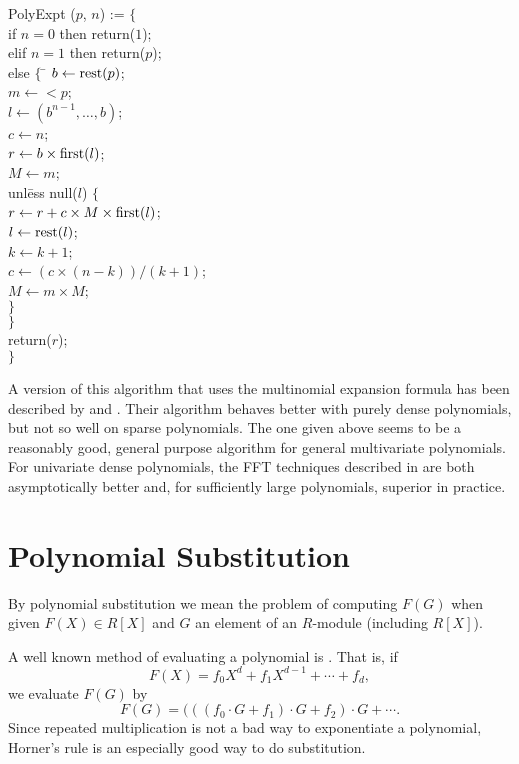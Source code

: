 \begindsacode
PolyExpt ($p$, $n$) := $\{$ \\
\> if $n=0$ then return($1$); \\
\> elif $n=1$ then return($p$); \\
\> else $\{$ \= $b \leftarrow \mbox{\rm rest}(p)$; \\
\> \> $m \leftarrow \lt p$; \\
\> \> $l \leftarrow (b^{n-1}, \ldots, b)$; \\
\> \> $c \leftarrow n$; \\
\> \> $r \leftarrow b \times \mbox{\rm first}(l)$; \\
\> \> $M \leftarrow m$; \\
\> \> unl\=ess null($l$) $\{$ \\
\> \> \> $r \leftarrow r + c \times M \times \mbox{\rm first}(l)$; \\
\> \> \> $l \leftarrow \mbox{\rm rest}(l)$; \\
\> \> \> $k \leftarrow k+1$; \\
\> \> \> $c \leftarrow (c \times (n - k))/(k+1)$; \\
\> \> \> $M \leftarrow m \times M$; \\
\> \> \> $\}$ \\
\> \> $\}$ \\
\> \> return($r$); \\
\> $\}$
\enddsacode

A version of this algorithm that uses the multinomial expansion
formula has been described by {\Alagar} and {\Probst}
\cite{Alagar:Probst87}.  Their algorithm behaves better with purely
dense polynomials, but not so well on sparse polynomials.  The one
given above seems to be a reasonably good, general purpose algorithm
for general multivariate polynomials.  For univariate dense
polynomials, the FFT techniques described in 
are both asymptotically better and, for sufficiently large
polynomials, superior in practice.

\section{Polynomial Substitution}
\label{Poly:Subs:Sec}

By polynomial substitution we mean the problem of computing $F(G)$
when given $F(X) \in R[X]$ and $G$ an element of an $R$-module
(including $R[X]$).

A well known method of evaluating a polynomial is .  That is, if
\[
F(X) = f_0 X^d + f_1 X^{d-1} + \cdots + f_d,
\]
we evaluate $F(G)$ by
\[
F(G) = (((f_0 \cdot G + f_1) \cdot G + f_2) \cdot G + \cdots.
\]
Since repeated multiplication is not a bad way to exponentiate a
polynomial, Horner's rule is an especially good way to do
substitution.  

